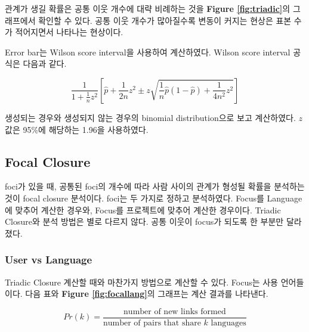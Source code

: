 \documentclass[10pt, a4paper, titlepage]{article}
\begin{document}
관계가 생길 확률은 공통 이웃 개수에 대략 비례하는 것을 {\bf Figure \ref{fig:triadic}}의 그래프에서 확인할 수 있다. 공통 이웃 개수가 많아질수록 변동이 커지는 현상은 표본 수가 적어지면서 나타나는 현상이다.

Error bar는 Wilson score interval을 사용하여 계산하였다. Wilson score interval 공식은 다음과 같다\cite{r10}.

$$
\frac{1}{1 + \frac{1}{n}z^2} \left[ 
\hat{p} + \frac{1}{2n} z^2 \pm z 
\sqrt{\frac{1}{n} \hat{p} (1- \hat{p}) + \frac{1}{4n^2} z^2}
\right]
$$

생성되는 경우와 생성되지 않는 경우의 binomial distribution으로 보고 계산하였다. $z$ 값은 95\%에 해당하는 1.96을 사용하였다.

\FloatBarrier

\subsection{Focal Closure}

foci가 있을 때, 공통된 foci의 개수에 따라 사람 사이의 관계가 형성될 확률을 분석하는 것이 focal closure 분석이다. foci는 두 가지로 정하고 분석하였다. Focus를 Language에 맞추어 계산한 경우와, Focus를 프로젝트에 맞추어 계산한 경우이다. Triadic Closure와 분석 방법은 별로 다르지 않다. 공통 이웃이 focus가 되도록 한 부분만 달라졌다.

\subsubsection{User vs Language}

Triadic Closure 계산할 때와 마찬가지 방법으로 계산할 수 있다. Focus는 사용 언어들이다. 다음 표와 
{\bf Figure \ref{fig:focallang}}의 
그래프는 계산 결과를 나타낸다.

$$
Pr(k) = \frac{\textrm{number of new links formed}}{\textrm{number of pairs that share } k \textrm{ languages}}
$$
\end{document}

